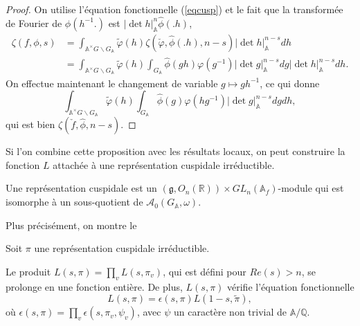 \begin{proof}
On utilise l'équation fonctionnelle (\ref{eqcusp}) et le fait que la transformée de Fourier de $\phi(h^{-1}.)$ est $|\det h|_\mathbb{A}^n\hat{\phi}(.h)$,
\begin{align}
\zeta(f, \phi, s) &= \int_{\mathbb{A}^\times G \backslash G_\mathbb{A}} \tilde{\varphi}(h) \zeta(\check{\varphi}, \hat{\phi}(.h), n-s)|\det h|_\mathbb{A}^{n-s} dh \\
&= \int_{\mathbb{A}^\times G \backslash G_\mathbb{A}} \tilde{\varphi}(h) \int_{G_\mathbb{A}}\hat{\phi}(gh)\varphi(g^{-1})|\det g|_\mathbb{A}^{n-s} dg |\det h|_\mathbb{A}^{n-s} dh.
\end{align}
On effectue maintenant le changement de variable $g \mapsto gh^{-1}$, ce qui donne
\begin{equation}
\int_{\mathbb{A}^\times G \backslash G_\mathbb{A}} \tilde{\varphi}(h) \int_{G_\mathbb{A}}\hat{\phi}(g)\varphi(hg^{-1})|\det g|_\mathbb{A}^{n-s} dg dh,
\end{equation}
qui est bien $\zeta(\check{f}, \hat{\phi}, n-s)$.
\end{proof}

Si l'on combine cette proposition avec les résultats locaux, on peut construire la fonction $L$ attachée à une représentation cuspidale irréductible.
\begin{definition}
Une représentation cuspidale est un $(\mathfrak{g}, O_n(\mathbb{R})) \times GL_n(\mathbb{A}_f)$-module qui est isomorphe à un sous-quotient de $\mathcal{A}_0(G_\mathbb{A}, \omega)$.
\end{definition}

Plus précisément, on montre le
\begin{theoreme}
Soit $\pi$ une représentation cuspidale irréductible.

Le produit $L(s, \pi) = \prod_v L(s, \pi_v)$, qui est défini pour $Re(s) > n$, se prolonge en une fonction entière. De plus, $L(s, \pi)$ vérifie l'équation fonctionnelle
\begin{equation}
L(s,\pi) = \epsilon(s,\pi)L(1-s,\tilde{\pi}),
\end{equation}
où $\epsilon(s,\pi) = \prod_v \epsilon(s, \pi_v, \psi_v)$, avec $\psi$ un caractère non trivial de $\mathbb{A}/\mathbb{Q}$.
\end{theoreme}

